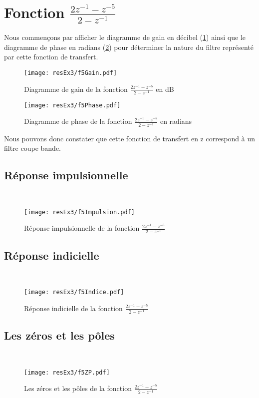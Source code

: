 \section{Fonction $\frac{2z^{-1}-z^{-5}}{2-z^{-1}}$}
Nous commençons par afficher le diagramme de gain en décibel (\ref{f5 Diagramme de gain}) ainsi que le diagramme de phase en radians (\ref{f5 Diagramme de phase}) pour déterminer la nature du filtre représenté par cette fonction de transfert.
\begin{figure}[H]
\centering
\texttt{[image: resEx3/f5Gain.pdf]}
\caption{Diagramme de gain de la fonction $\frac{2z^{-1}-z^{-5}}{2-z^{-1}}$ en dB}
\label{f5 Diagramme de gain}
\end{figure}
\begin{figure}[H]
\centering
\texttt{[image: resEx3/f5Phase.pdf]}
\caption{Diagramme de phase de la fonction $\frac{2z^{-1}-z^{-5}}{2-z^{-1}}$ en radians}
\label{f5 Diagramme de phase}
\end{figure}
Nous pouvons donc constater que cette fonction de transfert en z correspond à un filtre coupe bande.
\subsection{Réponse impulsionnelle}
~\\
\begin{figure}[H]
\centering
\texttt{[image: resEx3/f5Impulsion.pdf]}
\caption{Réponse impulsionnelle de la fonction $\frac{2z^{-1}-z^{-5}}{2-z^{-1}}$ }
\end{figure}

\subsection{Réponse indicielle}
~\\
\begin{figure}[H]
\centering
\texttt{[image: resEx3/f5Indice.pdf]}
\caption{Réponse indicielle de la fonction $\frac{2z^{-1}-z^{-5}}{2-z^{-1}}$ }
\end{figure}

\subsection{Les zéros et les pôles}
~\\
\begin{figure}[H]
\centering
\texttt{[image: resEx3/f5ZP.pdf]}
\caption{Les zéros et les pôles de la fonction $\frac{2z^{-1}-z^{-5}}{2-z^{-1}}$ }
\end{figure}

